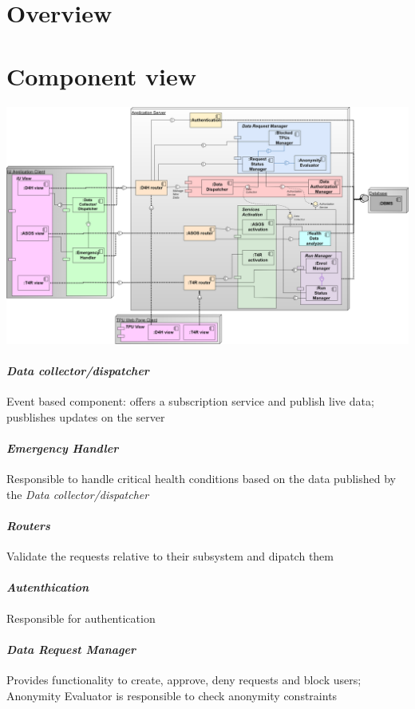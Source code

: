 \section{Overview}
\section{Component view}
\includegraphics[width = \textwidth]{sections/architecturalDesign/ComponentDiagram.png}
\paragraph{\textit{Data collector/dispatcher}} Event based component: offers a subscription service and publish live data; pusblishes updates on the server
\paragraph{\textit{Emergency Handler}} Responsible to handle critical health conditions based on the data published by the \textit{Data collector/dispatcher}
\paragraph{\textit{Routers}} Validate the requests relative to their subsystem and dipatch them
\paragraph{\textit{Autenthication}} Responsible for authentication
\paragraph{\textit{Data Request Manager}} Provides functionality to create, approve, deny requests and block users; Anonymity Evaluator is responsible to check anonymity constraints 
